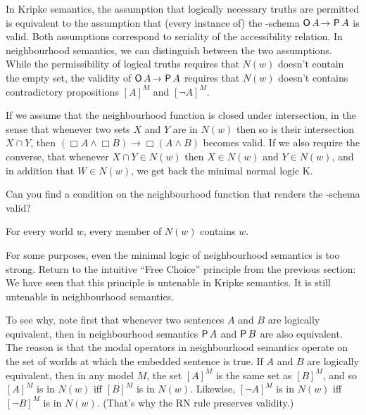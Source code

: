 In Kripke semantics, the assumption that logically necessary truths are
permitted is equivalent to the assumption that (every instance of) the
-schema $\Ob A \to \Pe A$ is valid. Both assumptions correspond to
seriality of the accessibility relation. In neighbourhood semantics, we can
distinguish between the two assumptions. While the permissibility of logical
truths requires that $N(w)$ doesn't contain the empty set, the validity of
$\Ob A \to \Pe A$ requires that $N(w)$ doesn't contains contradictory
propositions $[A]^M$ and $[\neg A]^M$.

If we assume that the neighbourhood function is closed under intersection, in
the sense that whenever two sets $X$ and $Y$ are in $N(w)$ then so is their
intersection $X\cap Y$, then $(\Box A \land \Box B) \to \Box (A \land B)$
becomes valid. If we also require the converse, that whenever $X\cap Y \in N(w)$
then $X \in N(w)$ and $Y\in N(w)$, and in addition that $W \in N(w)$, we get
back the minimal normal logic K.


\begin{exercise}
  Can you find a condition on the neighbourhood function that renders the
  -schema valid?
\end{exercise}
\begin{solution}
  For every world $w$, every member of $N(w)$ contains $w$.
\end{solution}

For some purposes, even the minimal logic of neighbourhood semantics is too
strong. Return to the intuitive ``Free Choice'' principle from the previous
section:
%
%
We have seen that this principle is untenable in Kripke semantics. It is
still untenable in neighbourhood semantics.

To see why, note first that whenever two sentences $A$ and $B$ are logically
equivalent, then in neighbourhood semantics $\operatorname{\mathsf{P}} A$ and $\operatorname{\mathsf{P}} B$ are also
equivalent. The reason is that the modal operators in neighbourhood semantics
operate on the set of worlds at which the embedded sentence is true. If $A$ and
$B$ are logically equivalent, then in any model $M$, the set $[A]^M$ is the same
set as $[B]^M$, and so $[A]^M$ is in $N(w)$ iff $[B]^M$ is in $N(w)$. Likewise,
$[\neg A]^M$ is in $N(w)$ iff $[\neg B]^M$ is in $N(w)$. (That's why the RN rule preserves validity.)

